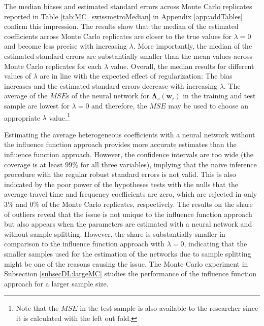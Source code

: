 \documentclass[a4paper, 12pt]{article}
\begin{document}
The median biases and estimated standard errors across Monte Carlo replicates reported in Table \ref{tab:MC_swissmetroMedian} in Appendix \ref{app:addTables} confirm this impression. The results show that the median of the estimated coefficients across Monte Carlo replicates are closer to the true values for $\lambda=0$ and become less precise with increasing $\lambda$. More importantly, the median of the estimated standard errors are substantially smaller than the mean values across Monte Carlo replicates for each $\lambda$ value. Overall, the median results for different values of $\lambda$ are in line with the expected effect of regularization: The bias increases and the estimated standard errors decrease with increasing $\lambda$. The average of the $MSE$s of the neural network for $\bm{\Lambda}_s(\bm{w}_i)$ in the training and test sample are lowest for $\lambda=0$ and therefore, the $MSE$ may be used to choose an appropriate $\lambda$ value.\footnote{Note that  the $MSE$ in the test sample is also available to the researcher since it is calculated with the left out fold.}

Estimating the average heterogeneous coefficients with a neural network without the influence function approach provides more accurate estimates than the influence function approach. However, the confidence intervals are too wide (the coverage is at least $99\%$ for all three variables), implying that the naive inference procedure with the regular robust standard errors is not valid. This is also indicated by the poor power of the hypotheses tests with the nulls that the average travel time and frequency coefficients are zero, which are rejected in only $3\%$ and $0\%$ of the Monte Carlo replicates, respectively.
The results on the share of outliers reveal that the issue is not unique to the influence function approach but also appears when the parameters are estimated with a neural network and without sample splitting. However, the share is substantially smaller in comparison to the influence function approach with $\lambda=0$, indicating that the smaller samples used for the estimation of the networks due to sample splitting might be one of the reasons causing the issue. The Monte Carlo experiment in Subsection \ref{subsecDL:largeMC} studies the performance of the influence function approach for a larger sample size.\\
\end{document}
